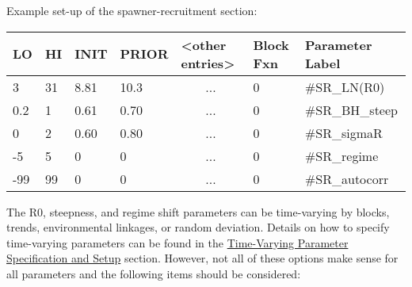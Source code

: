 Example set-up of the spawner-recruitment section:
\begin{center}
	\begin{longtable}{p{1cm} p{1cm} p{1cm}  p{1.5cm}  p{3cm}  p{2cm}  p{3.5cm}  }
		
		\hline
		LO \Tstrut & HI & INIT & PRIOR &  <other entries> & Block Fxn & Parameter Label\Bstrut\\
		\hline
		3    & 31 & 8.81 & 10.3 & \multicolumn{1}{c}{...} & 0 & \#SR\_LN(R0) \Tstrut\\
		0.2  & 1  & 0.61 & 0.70 & \multicolumn{1}{c}{...} & 0 & \#SR\_BH\_steep \\
		0    & 2  & 0.60 & 0.80 & \multicolumn{1}{c}{...} & 0 & \#SR\_sigmaR \\
		-5   & 5  & 0    & 0    & \multicolumn{1}{c}{...} & 0 & \#SR\_regime\\
		-99  & 99 & 0    & 0    & \multicolumn{1}{c}{...} & 0 & \#SR\_autocorr \Bstrut\\
		\hline
	\end{longtable}
\end{center}

The R0, steepness, and regime shift parameters can be time-varying by blocks, trends, environmental linkages, or random deviation.  Details on how to specify time-varying parameters can be found in the \hyperlink{(tvOrder)}{Time-Varying Parameter Specification and Setup} section. However, not all of these options make sense for all parameters and the following items should be considered:

